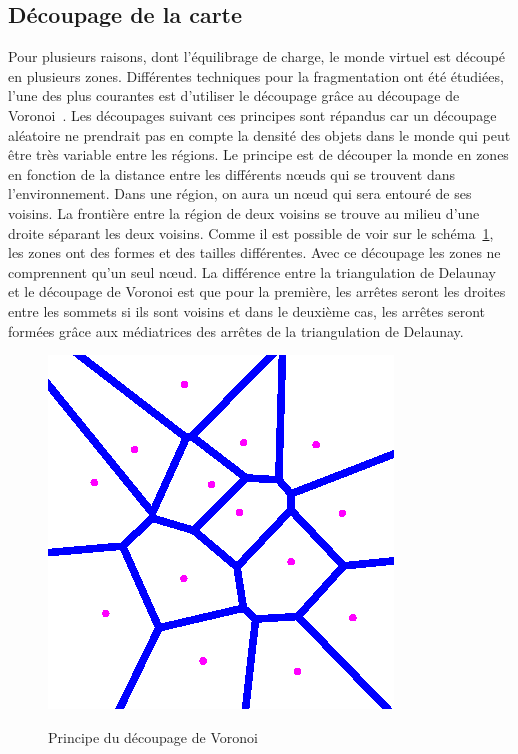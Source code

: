 	\subsection{Découpage de la carte}
	Pour plusieurs raisons, dont l'équilibrage de charge, le monde virtuel est découpé en plusieurs zones. Différentes techniques pour la fragmentation ont été étudiées, l'une des plus courantes est d'utiliser le découpage grâce au découpage de Voronoi~\cite{1016552}. Les découpages suivant ces principes sont répandus car un découpage aléatoire ne prendrait pas en compte la densité des objets dans le monde qui peut être très variable entre les régions. Le principe est de découper la monde en zones en fonction de la distance entre les différents nœuds qui se trouvent dans l'environnement. Dans une région, on aura un nœud qui sera entouré de ses voisins. La frontière entre la région de deux voisins se trouve au milieu d'une droite séparant les deux voisins. Comme il est possible de voir sur le schéma~\ref{Voronoi}, les zones ont des formes et des tailles différentes. Avec ce découpage les zones ne comprennent qu'un seul nœud. La différence entre la triangulation de Delaunay et le découpage de Voronoi est que pour la première, les arrêtes seront les droites entre les sommets si ils sont voisins et dans le deuxième cas, les arrêtes seront formées grâce aux médiatrices des arrêtes de la triangulation de Delaunay.\\ 
	\vspace{5mm}
        \begin{figure}[!h]
        \centering
        \includegraphics[scale=0.45]{./Ressources/Images/voronoi.png}\\
        \caption{Principe du découpage de Voronoi}
        \label{Voronoi}
        \end{figure}
        \vspace{5mm}


